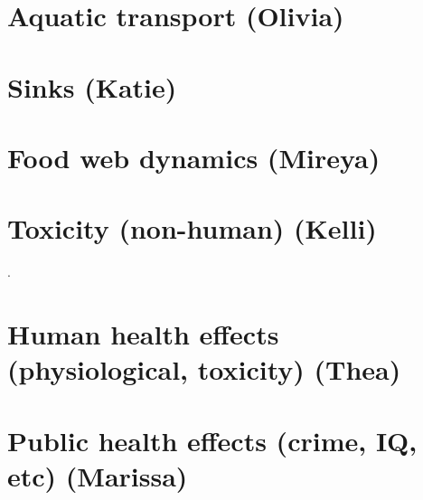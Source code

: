 \documentclass{article}\usepackage[]{graphicx}\usepackage[]{color}
\begin{document}
\section{Aquatic transport (Olivia)}

\section{Sinks (Katie)}\section{Food web dynamics (Mireya)}

\section{Toxicity (non-human) (Kelli)}

. 


\section{Human health effects (physiological, toxicity) (Thea)}

\section{Public health effects (crime, IQ, etc) (Marissa)}
\end{document}
